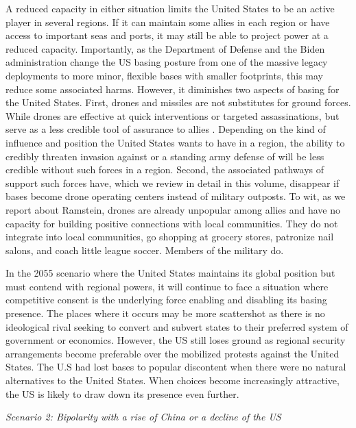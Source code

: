 A reduced capacity in either situation limits the United States to be an active player in several regions. If it can maintain some allies in each region or have access to important seas and ports, it may still be able to project power at a reduced capacity. Importantly, as the Department of Defense and the Biden administration change the US basing posture from one of the massive legacy deployments to more minor, flexible bases with smaller footprints, this may reduce some associated harms. However, it diminishes two aspects of basing for the United States. First, drones and missiles are not substitutes for ground forces. While drones are effective at quick interventions or targeted assassinations, but serve as a less credible tool of assurance to allies \cite{cypher2016,mehta2019}. Depending on the kind of influence and position the United States wants to have in a region, the ability to credibly threaten invasion against or a standing army defense of will be less credible without such forces in a region. Second, the associated pathways of support such forces have, which we review in detail in this volume, disappear if bases become drone operating centers instead of military outposts. To wit, as we report about Ramstein, drones are already unpopular among allies and have no capacity for building positive connections with local communities. They do not integrate into local communities, go shopping at grocery stores, patronize nail salons, and coach little league soccer. Members of the military do.

In the 2055 scenario where the United States maintains its global position but must contend with regional powers, it will continue to face a situation where competitive consent is the underlying force enabling and disabling its basing presence. The places where it occurs may be more scattershot as there is no ideological rival seeking to convert and subvert states to their preferred system of government or economics. However, the US still loses ground as regional security arrangements become preferable over the mobilized protests against the United States. The U.S had lost bases to popular discontent when there were no natural alternatives to the United States. When choices become increasingly attractive, the US is likely to draw down its presence even further. 



\textit{Scenario 2: Bipolarity with a rise of China or a decline of the US}

